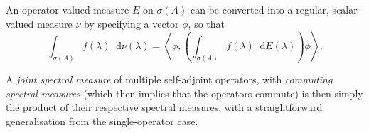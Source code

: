 \documentclass[10pt, a4paper]{article}
\numberwithin{equation}{section} %
\theoremstyle{definition}
\theoremstyle{plain}
\newcommand{\dif}{\mathop{}\!\mathrm{d}} %
\newcommand{\?}{\mathrel{?}} %
\newcommand{\angleb}[1]{\left\langle #1 \right\rangle} %
\begin{document}
\begin{appendices}
      An operator-valued measure \(E\) on \(\sigma(A)\) can be converted into a regular, scalar-valued measure \(\nu\) by specifying a vector \(\phi\), so that
      \[ \int_{\sigma(A)} f(\lambda) \dif{\nu(\lambda)} = \angleb{\phi, \left(\int_{\sigma(A)} f(\lambda) \dif{E(\lambda)}\right) \phi}. \]

      A \emph{joint spectral measure} of multiple self-adjoint operators, with \emph{commuting spectral measures} (which then implies that the operators commute) is then simply the product of their respective spectral measures, with a straightforward generalisation from the single-operator case.


    \end{appendices}

    
\end{document}
